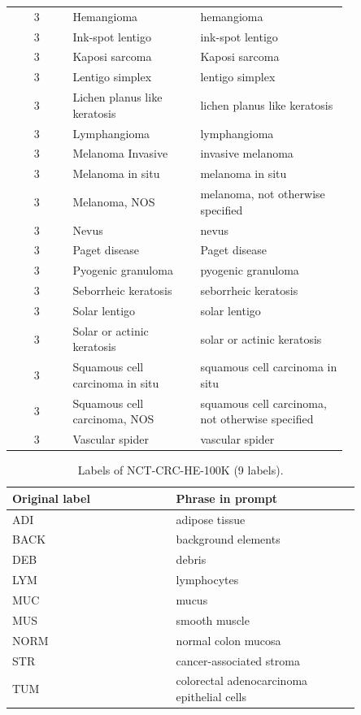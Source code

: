 \begin{table}[htbp]
\begin{tabular}{cp{0.38\linewidth}p{0.44\linewidth}}
3 & Hemangioma & hemangioma \\
3 & Ink-spot lentigo & ink-spot lentigo \\
3 & Kaposi sarcoma & Kaposi sarcoma \\
3 & Lentigo simplex & lentigo simplex \\
3 & Lichen planus like keratosis & lichen planus like keratosis \\
3 & Lymphangioma & lymphangioma \\
3 & Melanoma Invasive & invasive melanoma \\
3 & Melanoma in situ & melanoma in situ \\
3 & Melanoma, NOS & melanoma, not otherwise specified \\
3 & Nevus & nevus \\
3 & Paget disease & Paget disease \\
3 & Pyogenic granuloma & pyogenic granuloma \\
3 & Seborrheic keratosis & seborrheic keratosis \\
3 & Solar lentigo & solar lentigo \\
3 & Solar or actinic keratosis & solar or actinic keratosis \\
3 & Squamous cell carcinoma in situ & squamous cell carcinoma in situ \\
3 & Squamous cell carcinoma, NOS & squamous cell carcinoma, not otherwise specified \\
3 & Vascular spider & vascular spider \\
\bottomrule
\end{tabular}
\end{table}

\begin{table}[htbp]
\centering
\small
\caption{Labels of NCT-CRC-HE-100K (9 labels).}\label{tab:labels_NCT_CRC_HE_100K_1000}
\begin{tabular}{p{0.4\linewidth}p{0.45\linewidth}}
\toprule
Original label & Phrase in prompt \\
\midrule
ADI & adipose tissue \\
BACK & background elements \\
DEB & debris \\
LYM & lymphocytes \\
MUC & mucus \\
MUS & smooth muscle \\
NORM & normal colon mucosa \\
STR & cancer-associated stroma \\
TUM & colorectal adenocarcinoma epithelial cells \\
\bottomrule
\end{tabular}
\end{table}

